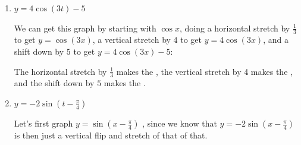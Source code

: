 \documentclass[main]{subfiles}
\begin{document}
\begin{enumerate}[resume]
\begin{enumerate}
\begin{solution}
    \end{solution}

  \item
    \begin{problem}[\vfill]
      $\displaystyle y = 4 \cos(3t) - 5$
    \end{problem}

    \begin{solution}
      We can get this graph by starting with $\cos x$, doing a horizontal
      stretch by $\frac{1}{3}$ to get \color{red} $y =
      \cos(3x)$\color{black}, a vertical stretch by $4$ to get
      \color{green!70!black} $y = 4 \cos(3x)$\color{black}, and a
      shift down by $5$ to get \color{blue} $y = 4 \cos(3x) -5$\color{black}:
      \begin{center}
      \end{center}
      The horizontal stretch by $\frac{1}{3}$ makes the , the vertical stretch by 4 makes the
      , and the shift down by $5$ makes the
      . 
    \end{solution}

  \item
    \begin{problem}[\vfill]
      $ y = - 2 \sin( t - \frac{\pi}{4} )$
    \end{problem}

    \begin{solution}
      Let's first graph \color{red} $y = \sin \left( x - \frac{\pi}{4}
      \right)$ \color{black}, since we know that \color{blue} $y = - 2 \sin
      \left( x - \frac{\pi}{4} \right)$ \color{black} is then just a
      vertical flip and stretch of that of that.


\end{solution}
\end{enumerate}
\end{enumerate}
\end{document}
